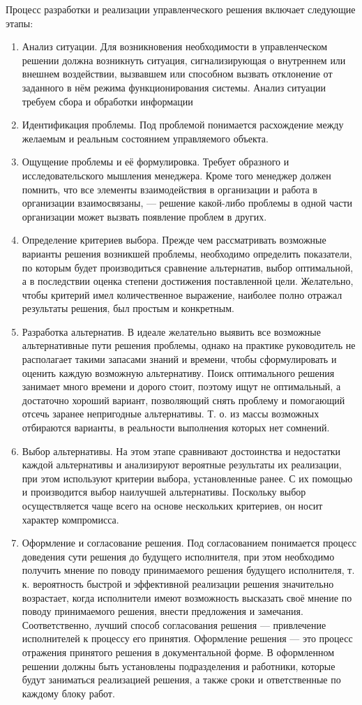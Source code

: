 \documentclass[12pt, russian, oneside, article]{ncc}
\begin{document}
Процесс разработки и реализации управленческого решения включает следующие этапы:
\begin{enumerate}
\item Анализ ситуации. Для возникновения необходимости в управленческом решении должна возникнуть ситуация, сигнализирующая о внутреннем или внешнем воздействии, вызвавшем или способном вызвать отклонение от заданного в нём режима функционирования системы. Анализ ситуации требуем сбора и обработки информации
\item Идентификация проблемы. Под проблемой понимается расхождение между желаемым и реальным состоянием управляемого объекта.
\item Ощущение проблемы и её формулировка. Требует образного и исследовательского мышления менеджера. Кроме того менеджер должен помнить, что все элементы взаимодействия в организации и работа в организации взаимосвязаны, --- решение какой-либо проблемы в одной части организации может вызвать появление проблем в других.
\item Определение критериев выбора. Прежде чем рассматривать возможные варианты решения возникшей проблемы, необходимо определить показатели, по которым будет производиться сравнение альтернатив, выбор оптимальной, а в последствии оценка степени достижения поставленной цели. Желательно, чтобы критерий имел количественное выражение, наиболее полно отражал результаты решения, был простым и конкретным.
\item Разработка альтернатив. В идеале желательно выявить все возможные альтернативные пути решения проблемы, однако на практике руководитель не располагает такими запасами знаний и времени, чтобы сформулировать и оценить каждую возможную альтернативу. Поиск оптимального решения занимает много времени и дорого стоит, поэтому ищут не оптимальный, а достаточно хороший вариант, позволяющий снять проблему и помогающий отсечь заранее непригодные альтернативы. Т. о. из массы возможных отбираются варианты, в реальности выполнения которых нет сомнений.
\item Выбор альтернативы. На этом этапе сравнивают достоинства и недостатки каждой альтернативы и анализируют вероятные результаты их реализации, при этом используют критерии выбора, установленные ранее. С их помощью и производится выбор наилучшей альтернативы. Поскольку выбор осуществляется чаще всего на основе нескольких критериев, он носит характер компромисса.
\item Оформление и согласование решения. Под согласованием понимается процесс доведения сути решения до будущего исполнителя, при этом необходимо получить мнение по поводу принимаемого решения будущего исполнителя, т. к. вероятность быстрой и эффективной реализации решения значительно возрастает, когда исполнители имеют возможность высказать своё мнение по поводу принимаемого решения, внести предложения и замечания. Соответственно, лучший способ согласования решения --- привлечение исполнителей к процессу его принятия. Оформление решения --- это процесс отражения принятого решения в документальной форме. В оформленном решении должны быть установлены подразделения и работники, которые будут заниматься реализацией решения, а также сроки и ответственные по каждому блоку работ.

\end{enumerate}
\end{document}
